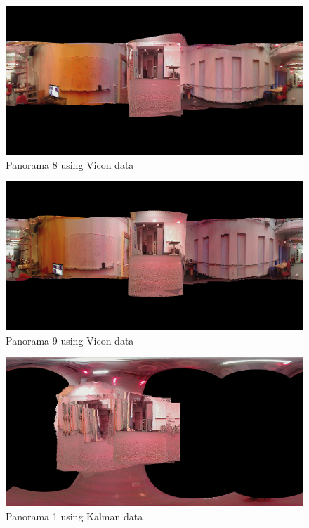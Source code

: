 \documentclass[a4paper]{article}
\begin{document}
\begin{figure}[h]
  \centering
    \includegraphics[width=1\textwidth]{PANORAMA8_nocrop_small.png}
  \caption{Panorama 8 using Vicon data\label{fig:panorama8_nocrop}}
\end{figure}

\begin{figure}[h]
  \centering
    \includegraphics[width=1\textwidth]{PANORAMA9_nocrop_small.png}
  \caption{Panorama 9 using Vicon data\label{fig:panorama9_nocrop}}
\end{figure}

\begin{figure}[h]
  \centering
    \includegraphics[width=1\textwidth]{pan_trainset1_kalman_small.png}
  \caption{Panorama 1 using Kalman data\label{fig:panorama1_kalman}}
\end{figure}
\end{document}
